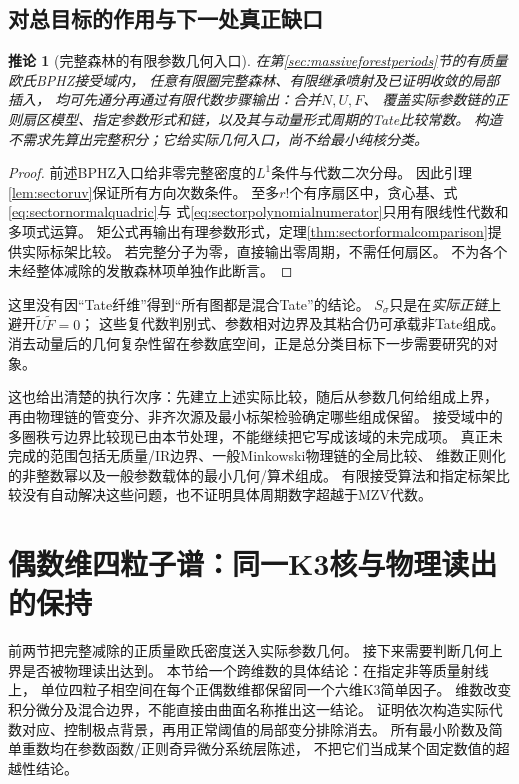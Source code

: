 \documentclass[11pt,a4paper]{ctexart}
\theoremstyle{cnplain}\newtheorem{theorem}{定理}[section]
\newtheorem{corollary}[theorem]{推论}
\theoremstyle{definition}\newtheorem{definition}[theorem]{定义}
\theoremstyle{remark}\newtheorem{remark}[theorem]{注}
\begin{document}
\subsection{对总目标的作用与下一处真正缺口}

\begin{corollary}[完整森林的有限参数几何入口]
\label{cor:sectorforestentry}
在第\ref{sec:massiveforestperiods}节的有质量欧氏BPHZ接受域内，
任意有限圈完整森林、有限继承喷射及已证明收敛的局部插入，
均可先通分再通过有限代数步骤输出：合并$N,U,F$、
覆盖实际参数链的正则扇区模型、指定参数形式和链，以及其与动量形式周期的Tate比较常数。
构造不需求先算出完整积分；它给实际几何入口，尚不给最小纯核分类。
\end{corollary}

\begin{proof}
前述BPHZ入口给非零完整密度的$L^1$条件与代数二次分母。
因此引理\ref{lem:sectoruv}保证所有方向次数条件。
至多$r!$个有序扇区中，贪心基、式\eqref{eq:sectornormalquadric}与
式\eqref{eq:sectorpolynomialnumerator}只用有限线性代数和多项式运算。
矩公式再输出有理参数形式，定理\ref{thm:sectorformalcomparison}提供实际标架比较。
若完整分子为零，直接输出零周期，不需任何扇区。
不为各个未经整体减除的发散森林项单独作此断言。
\end{proof}

这里没有因“Tate纤维”得到“所有图都是混合Tate”的结论。
$S_\sigma$只是在\emph{实际正链}上避开$\widetilde U\widetilde F=0$；
这些复代数判别式、参数相对边界及其粘合仍可承载非Tate组成。
消去动量后的几何复杂性留在参数底空间，正是总分类目标下一步需要研究的对象。

这也给出清楚的执行次序：先建立上述实际比较，随后从参数几何给组成上界，
再由物理链的管变分、非齐次源及最小标架检验确定哪些组成保留。
接受域中的多圈秩亏边界比较现已由本节处理，不能继续把它写成该域的未完成项。
真正未完成的范围包括无质量/IR边界、一般Minkowski物理链的全局比较、
维数正则化的非整数幂以及一般参数载体的最小几何/算术组成。
有限接受算法和指定标架比较没有自动解决这些问题，也不证明具体周期数字超越于MZV代数。


\section{偶数维四粒子谱：同一K3核与物理读出的保持}\label{sec:evendimk3}
前两节把完整减除的正质量欧氏密度送入实际参数几何。
接下来需要判断几何上界是否被物理读出达到。
本节给一个跨维数的具体结论：在指定非等质量射线上，
单位四粒子相空间在每个正偶数维都保留同一个六维K3简单因子。
维数改变积分微分及混合边界，不能直接由曲面名称推出这一结论。
证明依次构造实际代数对应、控制极点背景，再用正常阈值的局部变分排除消去。
所有最小阶数及简单重数均在参数函数/正则奇异微分系统层陈述，
不把它们当成某个固定数值的超越性结论。
\end{document}
